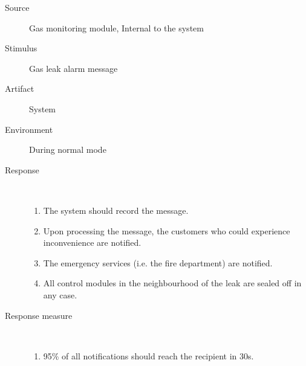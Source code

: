 \begin{description}
	\item[Source] Gas monitoring module, Internal to the system
	\item[Stimulus] Gas leak alarm message
	\item[Artifact] System
	\item[Environment] During normal mode
	\item[Response] \
		\begin{enumerate}
		  \item The system should record the message.
		  \item Upon processing the message, the customers who could experience
		  inconvenience are notified.
		  \item The emergency services (i.e. the fire department) are notified.
		  \item All control modules in the neighbourhood of the leak are sealed off in
		  any case.
		\end{enumerate}
	\item[Response measure] \ 
	\begin{enumerate}
	  \item 95\% of all notifications should reach the recipient in 30s. 
	\end{enumerate}
\end{description}